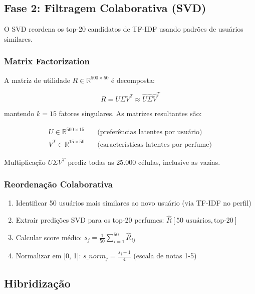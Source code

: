 \documentclass[12pt,a4paper]{article}
\begin{document}
\subsection{Fase 2: Filtragem Colaborativa (SVD)}

O SVD reordena os top-20 candidatos de TF-IDF usando padrões de usuários similares.

\subsubsection{Matrix Factorization}

A matriz de utilidade $R \in \mathbb{R}^{500 \times 50}$ é decomposta:

\begin{equation}
R = U \Sigma V^T \approx \hat{U} \hat{\Sigma} \hat{V}^T
\end{equation}

mantendo $k=15$ fatores singulares. As matrizes resultantes são:

\begin{align}
U \in \mathbb{R}^{500 \times 15} &\quad \text{(preferências latentes por usuário)} \\
V^T \in \mathbb{R}^{15 \times 50} &\quad \text{(características latentes por perfume)}
\end{align}

Multiplicação $U \Sigma V^T$ prediz todas as 25.000 células, inclusive as vazias.

\subsubsection{Reordenação Colaborativa}

\begin{enumerate}
    \item Identificar 50 usuários mais similares ao novo usuário (via TF-IDF no perfil)
    \item Extrair predições SVD para os top-20 perfumes: $\hat{R}[50 \text{ usuários}, \text{top-20}]$
    \item Calcular score médio: $s_j = \frac{1}{50} \sum_{i=1}^{50} \hat{R}_{ij}$
    \item Normalizar em [0, 1]: $s\_norm_j = \frac{s_j - 1}{4}$ (escala de notas 1-5)
\end{enumerate}

\subsection{Hibridização}
\end{document}
